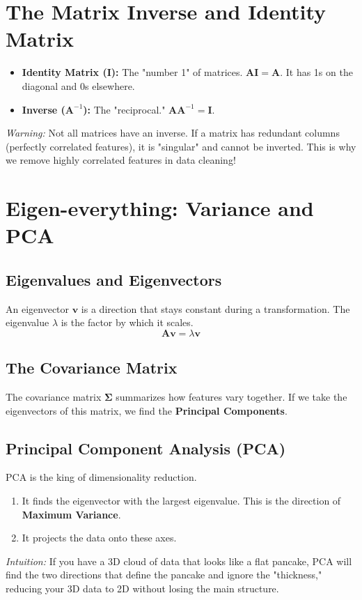 \documentclass{article}
\begin{document}
\section{The Matrix Inverse and Identity Matrix}
\begin{itemize}
    \item \textbf{Identity Matrix ($\mathbf{I}$):} The "number 1" of matrices. $\mathbf{AI} = \mathbf{A}$. It has 1s on the diagonal and 0s elsewhere.
    \item \textbf{Inverse ($\mathbf{A}^{-1}$):} The "reciprocal." $\mathbf{A} \mathbf{A}^{-1} = \mathbf{I}$. 
\end{itemize}
\textit{Warning:} Not all matrices have an inverse. If a matrix has redundant columns (perfectly correlated features), it is "singular" and cannot be inverted. This is why we remove highly correlated features in data cleaning!

\section{Eigen-everything: Variance and PCA}

\subsection{Eigenvalues and Eigenvectors}
An eigenvector $\mathbf{v}$ is a direction that stays constant during a transformation. The eigenvalue $\lambda$ is the factor by which it scales.
\begin{equation}
    \mathbf{A}\mathbf{v} = \lambda\mathbf{v}
\end{equation}

\subsection{The Covariance Matrix}
The covariance matrix $\mathbf{\Sigma}$ summarizes how features vary together. If we take the eigenvectors of this matrix, we find the \textbf{Principal Components}.

\subsection{Principal Component Analysis (PCA)}
PCA is the king of dimensionality reduction. 
\begin{enumerate}
    \item It finds the eigenvector with the largest eigenvalue. This is the direction of \textbf{Maximum Variance}.
    \item It projects the data onto these axes.
\end{enumerate}
\textit{Intuition:} If you have a 3D cloud of data that looks like a flat pancake, PCA will find the two directions that define the pancake and ignore the "thickness," reducing your 3D data to 2D without losing the main structure.
\end{document}
